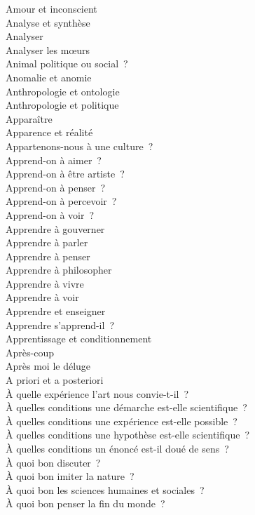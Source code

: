 \documentclass[a4paper,12pt]{article}
\begin{document}
Amour et inconscient \\
Analyse et synthèse \\
Analyser \\
Analyser les mœurs \\
Animal politique ou social ? \\
Anomalie et anomie \\
Anthropologie et ontologie \\
Anthropologie et politique \\
Apparaître \\
Apparence et réalité \\
Appartenons-nous à une culture ? \\
Apprend-on à aimer ? \\
Apprend-on à être artiste ? \\
Apprend-on à penser ? \\
Apprend-on à percevoir ? \\
Apprend-on à voir ? \\
Apprendre à gouverner \\
Apprendre à parler \\
Apprendre à penser \\
Apprendre à philosopher \\
Apprendre à vivre \\
Apprendre à voir \\
Apprendre et enseigner \\
Apprendre s'apprend-il ? \\
Apprentissage et conditionnement \\
Après-coup \\
Après moi le déluge \\
A priori et a posteriori \\
À quelle expérience l'art nous convie-t-il ? \\
À quelles conditions une démarche est-elle scientifique ? \\
À quelles conditions une expérience est-elle possible ? \\
À quelles conditions une hypothèse est-elle scientifique ? \\
À quelles conditions un énoncé est-il doué de sens ? \\
À quoi bon discuter ? \\
À quoi bon imiter la nature ? \\
À quoi bon les sciences humaines et sociales ? \\
À quoi bon penser la fin du monde ? \\
\end{document}
